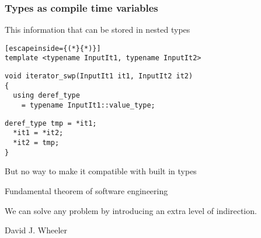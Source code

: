 \documentclass[14pt,a4paper,dvipsnames,usenames]{beamer}
\begin{document}
\begin{frame}[fragile]
  \frametitle{Types as compile time variables}

  This information that can be stored in nested types

  \vspace{.5cm}
  \begin{lstlisting}[escapeinside={(*}{*)}]
template <typename InputIt1, typename InputIt2>
  \end{lstlisting}
  \vspace*{-.4cm}
  \begin{lstlisting}[morekeywords={InputIt1,InputIt2,value_type}]
void iterator_swp(InputIt1 it1, InputIt2 it2)
{
  using deref_type
    = typename InputIt1::value_type;
  \end{lstlisting}
  \begin{lstlisting}[morekeywords={deref_type}]
  deref_type tmp = *it1;
  *it1 = *it2;
  *it2 = tmp;
}
  \end{lstlisting}

  \vspace{.5cm}
  But no way to make it compatible with built in types
\end{frame}

\begin{frame}

  \begin{center}\fontsize{16pt}{16pt}\selectfont\color{Tropiteal}
    Fundamental theorem of software engineering
  \end{center}

  \vspace{.25cm}
  \begin{center}
    \begin{minipage}{8cm}
      We can solve any problem by introducing an extra level of indirection.
    \end{minipage}
  \end{center}

  \vspace{.25cm}
  \begin{flushright}\color{ICantExpress!50!WhiteTrash}
    David J. Wheeler
  \end{flushright}

\end{frame}
\end{document}
